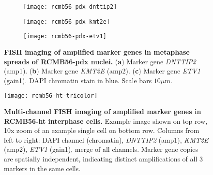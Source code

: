 \begin{figure}[!h]
    \centering
    \begin{subfigure}{0.32\textwidth}
        \centering
        \texttt{[image: rcmb56-pdx-dnttip2]}
        \caption{}
        \label{subfig:}
    \end{subfigure}
    \begin{subfigure}{0.32\textwidth}
        \centering
        \texttt{[image: rcmb56-pdx-kmt2e]}
        \caption{}
        \label{subfig:}
    \end{subfigure}
    \begin{subfigure}{0.32\textwidth}
        \centering
        \texttt{[image: rcmb56-pdx-etv1]}
        \caption{}
        \label{subfig:}
    \end{subfigure}    
    \caption[FISH imaging of amplified marker genes in RCMB56-pdx metaphase cells.]{\textbf{FISH imaging of amplified marker genes in metaphase spreads of RCMB56-pdx nuclei.} (\textbf{a}) Marker gene \textit{DNTTIP2} (amp1). (\textbf{b}) Marker gene \textit{KMT2E} (amp2). (\textbf{c}) Marker gene \textit{ETV1} (gain1). DAPI chromatin stain in blue. Scale bars $10\mu$m.
    }
    \label{fig:fish-rcmb56-pdx-metaphase}
\end{figure}

\begin{figure}
    \centering
    \texttt{[image: rcmb56-ht-tricolor]}
    \caption[Multi-channel FISH imaging of amplified marker genes in RCMB56-ht interphase cells.]{\textbf{Multi-channel FISH imaging of amplified marker genes in RCMB56-ht interphase cells.} Example image shown on top row, 10x zoom of an example single cell on bottom row. Columns from left to right: DAPI channel (chromatin), \textit{DNTTIP2} (amp1), \textit{KMT2E} (amp2), \textit{ETV1} (gain1), merge of all channels. Marker gene copies are spatially independent, indicating distinct amplifications of all 3 markers in the same cells. 
    }
    \label{fig:fish-rcmb56-ht-interphase}
\end{figure}


